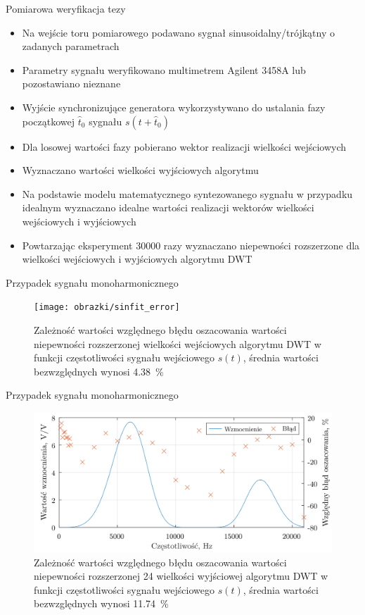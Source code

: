 \documentclass[12pt, polish, aspectratio = 169]{beamer}
\begin{document}
\begin{frame}{Pomiarowa weryfikacja tezy}
\begin{itemize}
\item Na wejście toru pomiarowego podawano sygnał sinusoidalny/trójkątny o zadanych parametrach
\item Parametry sygnału weryfikowano multimetrem Agilent 3458A lub pozostawiano nieznane
\item Wyjście synchronizujące generatora wykorzystywano do ustalania fazy początkowej $\hat{t}_{0}$ sygnału $s(t+\hat{t}_{0})$
\item Dla losowej wartości fazy pobierano wektor realizacji wielkości wejściowych
\item Wyznaczano wartości wielkości wyjściowych algorytmu
\item Na podstawie modelu matematycznego syntezowanego sygnału w przypadku idealnym wyznaczano idealne wartości realizacji wektorów wielkości wejściowych i wyjściowych
\item Powtarzając eksperyment \num{30000} razy wyznaczano niepewności rozszerzone dla wielkości wejściowych i wyjściowych algorytmu DWT
\end{itemize}
\end{frame}

\begin{frame}{Przypadek sygnału monoharmonicznego}
\begin{figure}
\begin{center}
\texttt{[image: obrazki/sinfit\_error]}
\caption{Zależność wartości względnego błędu oszacowania wartości niepewności rozszerzonej wielkości wejściowych algorytmu DWT w funkcji częstotliwości sygnału wejściowego $s(t)$, średnia wartości bezwzględnych wynosi \qty{4.38}{\percent}}
\label{fig:sinfit_error}
\end{center}
\end{figure}
\end{frame}

\begin{frame}{Przypadek sygnału monoharmonicznego}
\begin{figure}
\begin{center}
\includegraphics[scale = 0.75]{obrazki/mono_freqcomp}
\caption{Zależność wartości względnego błędu oszacowania wartości niepewności rozszerzonej \qty{24}{\numTej} wielkości wyjściowej algorytmu DWT w funkcji częstotliwości sygnału wejściowego $s(t)$, średnia wartości bezwzględnych wynosi \qty{11.74}{\percent}}
\label{fig:mono_freqcomp}
\end{center}
\end{figure}
\end{frame}
\end{document}
